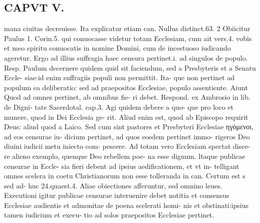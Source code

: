 \documentclass{article}
\begin{document}
\begin{pages}
\section*{CAPVT  V. }
\marginpar{[ p.247 ]}\pstart mana ciuitas decreuisse. Ita explicatur etiam can. Nullus distinct.63. 2 Obiicitur Paulus 1. Corin.5. qui conuocasse videtur totam Ecclesiam, cum ait vers.4. vobis et meo spiritu conuocatis in nomine Domini, cum de incestuoso iudicando ageretur. Ergo ad illius suffragia haec censura pertinet.i. ad singulos de populo. Resp. Paulum decernere quidem quid sit faciendum, sed a Presbyteris et a Senatu Eccle- siae:id enim suffragiis populi non permittit. Ita- que non pertinet ad populum ea deliberatio: sed ad praepositos Ecclesiae, populo assentiente. Aiunt Quod ad omnes pertinet, ab omnibus fie- ri debet. Respond. ex Ambrosio in lib.  de Digni- tate Sacerdotal. cap.3. Agi quidem debere a quo- que pro loco et munere, quod in Dei Ecclesia ge- rit. Aliud enim est, quod ab Episcopo requirit Deus: aliud quod a Laico. Sed cum sint pastores et Presbyteri Ecclesiae ηγόμενοι, ad eos censurae iu- dicium pertinet, ad quos eosdem pertinet immo- rigeros Deo diuini iudicii metu iniecto com- pescere. Ad totam vero Ecclesiam spectat disce- re alieno exemplo, quenque Deo rebellem poe- na esse dignum. ltaque publicae censurae in Eccle- sia fieri debent ad ipsius aedificationem, et vt in- telligant omnes scelera in coetu Christianorum non esse tolleranda in can. Certum est s sed ad- huc 24.quaest.4. Aliae obiectiones afferuntur, sed omnino leues. Executioni igitur publicae censurae interuenire debet notitia et consensus Ecclesiae audientis et admonitae de poena scelerati homi- nis et obstinati:ipsius tamen iudicium et execu- tio ad solos praepositos Ecclesiae pertinet.  \pend

\end{pages}
\end{document}
